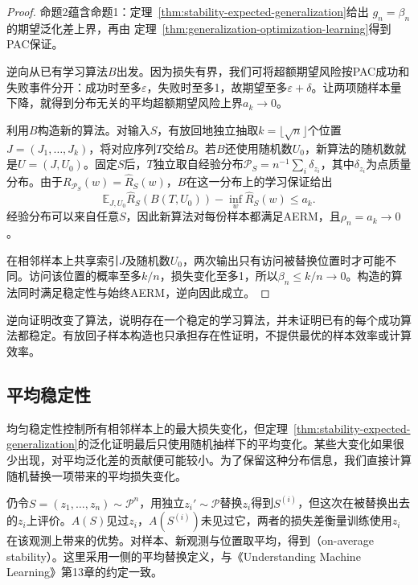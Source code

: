 \begin{proof}
命题2蕴含命题1：定理~\ref{thm:stability-expected-generalization}给出
$g_n=\beta_n$的期望泛化差上界，再由
定理~\ref{thm:generalization-optimization-learning}得到PAC保证。

逆向从已有学习算法$B$出发。因为损失有界，我们可将超额期望风险按PAC成功和失败事件分开：成功时至多$\varepsilon$，失败时至多1，故期望至多$\varepsilon+\delta$。让两项随样本量下降，就得到分布无关的平均超额期望风险上界$a_k\to0$。

利用$B$构造新的算法。对输入$S$，有放回地独立抽取$k=\lfloor\sqrt n\rfloor$个位置$J=(J_1,\ldots,J_k)$，将对应序列$T$交给$B$。若$B$还使用随机数$U_0$，新算法的随机数就是$U=(J,U_0)$。固定$S$后，$T$独立取自经验分布$\mathcal P_S=n^{-1}\sum_i\delta_{z_i}$，其中$\delta_{z_i}$为点质量分布。由于$R_{\mathcal P_S}(w)=\hat R_S(w)$，$B$在这一分布上的学习保证给出
\[
 \mathbb E_{J,U_0}\hat R_S(B(T,U_0))-\inf_w\hat R_S(w)\leq a_k.
\]
经验分布可以来自任意$S$，因此新算法对每份样本都满足AERM，且$\rho_n=a_k\to0$。

在相邻样本上共享索引$J$及随机数$U_0$，两次输出只有访问被替换位置时才可能不同。访问该位置的概率至多$k/n$，损失变化至多1，所以$\beta_n\leq k/n\to0$。构造的算法同时满足稳定性与始终AERM，逆向因此成立。
\end{proof}

逆向证明改变了算法，说明存在一个稳定的学习算法，并未证明已有的每个成功算法都稳定。有放回子样本构造也只承担存在性证明，不提供最优的样本效率或计算效率。

\subsection{平均稳定性}
\label{sec:on-average-stability}

均匀稳定性控制所有相邻样本上的最大损失变化，但定理~\ref{thm:stability-expected-generalization}的泛化证明最后只使用随机抽样下的平均变化。某些大变化如果很少出现，对平均泛化差的贡献便可能较小。为了保留这种分布信息，我们直接计算随机替换一项带来的平均损失变化。

仍令$S=(z_1,\ldots,z_n)\sim\mathcal P^n$，用独立$z_i'\sim\mathcal P$替换$z_i$得到$S^{(i)}$，但这次在被替换出去的$z_i$上评价。$A(S)$见过$z_i$，$A(S^{(i)})$未见过它，两者的损失差衡量训练使用$z_i$在该观测上带来的优势。对样本、新观测与位置取平均，得到（on-average stability）。这里采用一侧的平均替换定义，与《Understanding Machine Learning》第13章的约定一致。

